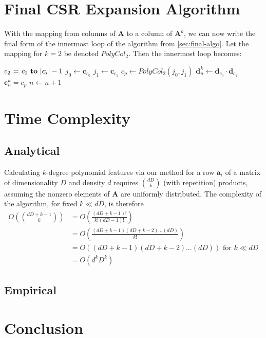 \documentclass{article} %
\begin{document}
\section{Final CSR Expansion Algorithm}
With the mapping from columns of $\bm{A}$ to a column of $\bm{A}^k$, we can now write the final form of the innermost loop of the algorithm from \ref{sec:final-algo}.
Let the mapping for $k=2$ be denoted $PolyCol_2$.
Then the innermost loop becomes:

\begin{codebox}
\footnotesize
    \zi         \For $c_2 \gets c_1 \To |\bm{c}_i|-1$ \Do
    \zi             $j_0 \gets \bm{c}_{c_0}$
    \zi             $j_1 \gets \bm{c}_{c_1}$
    \zi             $c_p \gets PolyCol_2(j_0, j_1)$
    \zi             $\bm{d}^k_{n} \gets \bm{d}_{c_0} \cdot \bm{d}_{c_1}$
    \zi             $\bm{c}^k_{n} = c_p$
    \zi             $n \gets n + 1$
                \End
\end{codebox}

\section{Time Complexity}
\subsection{Analytical}
Calculating $k$-degree polynomial features via our method for a row $\bm{a}_i$ of a matrix of dimensionality $D$ and density $d$ requires $\binom{dD}{k}$ (with repetition) products, assuming the nonzero elements of $\bm{A}$ are uniformly distributed.
The complexity of the algorithm, for fixed $k \ll dD$, is therefore
\begin{align}
O\left(\binom{dD+k-1}{k}\right) & = O\left(\frac{(dD+k-1)!}{k!(dD-1)!}\right)\\
& = O\left(\frac{(dD+k-1)(dD+k-2) \dots (dD)}{k!}\right)\\
& = O\left((dD+k-1)(dD+k-2) \dots (dD)\right) \mbox{ for } k \ll dD\\
& = O\left(d^kD^k\right)
\end{align}

\subsection{Empirical}
\section{Conclusion}




\end{document}
